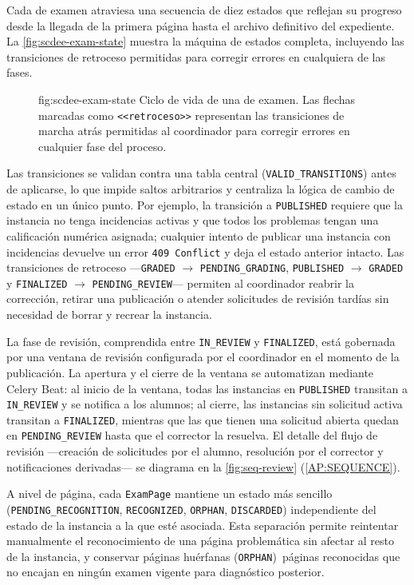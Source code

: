 Cada  de examen atraviesa una secuencia de diez estados
que reflejan su progreso desde la llegada de la primera página hasta el
archivo definitivo del expediente. La \cref{fig:scdee-exam-state}
muestra la máquina de estados completa, incluyendo las transiciones de
retroceso permitidas para corregir errores en cualquiera de las fases.

\begin{figure}[Máquina de estados de \texttt{ExamInstance}]%
              {fig:scdee-exam-state}%
              {Ciclo de vida de una  de examen. Las
               flechas marcadas como \texttt{<<retroceso>>} representan
               las transiciones de marcha atrás permitidas al
               coordinador para corregir errores en cualquier fase del
               proceso.}
\end{figure}

Las transiciones se validan contra una tabla central
(\texttt{VALID\_TRANSITIONS}) antes de aplicarse, lo que impide saltos
arbitrarios y centraliza la lógica de cambio de estado en un único
punto. Por ejemplo, la transición a \texttt{PUBLISHED} requiere que la
instancia no tenga incidencias activas y que todos los problemas tengan
una calificación numérica asignada; cualquier intento de publicar una
instancia con incidencias devuelve un error \texttt{409 Conflict} y deja
el estado anterior intacto. Las transiciones de retroceso
—\texttt{GRADED} $\to$ \texttt{PENDING\_GRADING}, \texttt{PUBLISHED}
$\to$ \texttt{GRADED} y \texttt{FINALIZED} $\to$
\texttt{PENDING\_REVIEW}— permiten al coordinador reabrir la
corrección, retirar una publicación o atender solicitudes de revisión
tardías sin necesidad de borrar y recrear la instancia.

La fase de revisión, comprendida entre \texttt{IN\_REVIEW} y
\texttt{FINALIZED}, está gobernada por una ventana de revisión
configurada por el coordinador en el momento de la publicación. La
apertura y el cierre de la ventana se automatizan mediante Celery Beat:
al inicio de la ventana, todas las instancias en \texttt{PUBLISHED}
transitan a \texttt{IN\_REVIEW} y se notifica a los alumnos; al
cierre, las instancias sin solicitud activa transitan a
\texttt{FINALIZED}, mientras que las que tienen una solicitud abierta
quedan en \texttt{PENDING\_REVIEW} hasta que el corrector la resuelva.
El detalle del flujo de revisión —creación de solicitudes por el
alumno, resolución por el corrector y notificaciones derivadas— se
diagrama en la \cref{fig:seq-review} (\cref{AP:SEQUENCE}).

A nivel de página, cada \texttt{ExamPage} mantiene un estado más
sencillo (\texttt{PENDING\_RECOGNITION}, \texttt{RECOGNIZED},
\texttt{ORPHAN}, \texttt{DISCARDED}) independiente del estado de la
instancia a la que esté asociada. Esta separación permite reintentar
manualmente el reconocimiento de una página problemática sin afectar al
resto de la instancia, y conservar páginas huérfanas
(\texttt{ORPHAN})~\textemdash{}páginas reconocidas que no encajan en
ningún examen vigente\textemdash{} para diagnóstico posterior.
